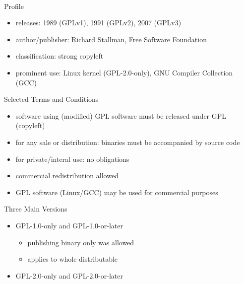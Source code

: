 \begin{frame}{\insertsubsection\ } %
	\begin{fancycolumns}
		\begin{definition}{Profile}
			\begin{itemize}
				\setlength\itemsep{.0em}
				\item releases: 1989 (GPLv1), 1991 (GPLv2), 2007 (GPLv3)
				\item author/publisher: Richard Stallman, Free Software Foundation
				\item classification: strong copyleft
				\item prominent use: Linux kernel (GPL-2.0-only), GNU Compiler Collection (GCC)
			\end{itemize}
		\end{definition}
		\begin{example}{Selected Terms and Conditions}
			\begin{itemize}
				\setlength\itemsep{.0em}
				\item software using (modified) GPL software must be released under GPL (copyleft) %
				\item for any sale or distribution: binaries must be accompanied by source code
				\item for private/interal use: no obligations
				\item commercial redistribution allowed
				\item GPL software (Linux/GCC) may be used for commercial purposes
			\end{itemize}
		\end{example}
		\nextcolumn
		\begin{exampletight}{}
			\centering{}
		\end{exampletight}
		\begin{note}{Three Main Versions}
			\begin{itemize}
				\item GPL-1.0-only and GPL-1.0-or-later
				\begin{itemize}
					\item publishing binary only was allowed
					\item applies to whole distributable
				\end{itemize}
				\item GPL-2.0-only and GPL-2.0-or-later
				\begin{itemize}

\end{itemize}
\end{itemize}
\end{note}
\end{fancycolumns}
\end{frame}
